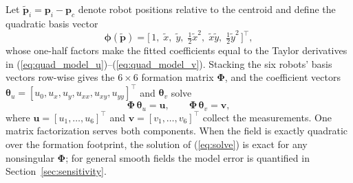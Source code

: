 \documentclass[lettersize,journal]{IEEEtran}
\begin{document}
Let $\tilde{\mathbf{p}}_i = \mathbf{p}_i - \mathbf{p}_c$ denote robot
positions relative to the centroid and define the quadratic basis vector
\begin{equation}
    \boldsymbol{\phi}(\tilde{\mathbf{p}}) =
    \bigl[\,1, \; \tilde{x}, \; \tilde{y}, \; \tfrac{1}{2}\tilde{x}^2, \;
    \tilde{x}\tilde{y}, \; \tfrac{1}{2}\tilde{y}^2\,\bigr]^\top,
    \label{eq:basis}
\end{equation}
whose one-half factors make the fitted coefficients equal to the Taylor
derivatives in (\ref{eq:quad_model_u})--(\ref{eq:quad_model_v}).
Stacking the six robots' basis vectors row-wise gives the $6 \times 6$
formation matrix $\boldsymbol{\Phi}$, and the coefficient vectors
$\boldsymbol{\theta}_u = [u_0, u_x, u_y, u_{xx}, u_{xy}, u_{yy}]^\top$
and $\boldsymbol{\theta}_v$ solve
\begin{equation}
    \boldsymbol{\Phi}\,\boldsymbol{\theta}_u = \mathbf{u}, \qquad
    \boldsymbol{\Phi}\,\boldsymbol{\theta}_v = \mathbf{v},
    \label{eq:solve}
\end{equation}
where $\mathbf{u} = [u_1, \ldots, u_6]^\top$ and $\mathbf{v} = [v_1,
\ldots, v_6]^\top$ collect the measurements. One matrix factorization
serves both components. When the field is exactly quadratic over the
formation footprint, the solution of (\ref{eq:solve}) is exact for any
nonsingular $\boldsymbol{\Phi}$; for general smooth fields the model
error is quantified in Section~\ref{sec:sensitivity}.
\end{document}
